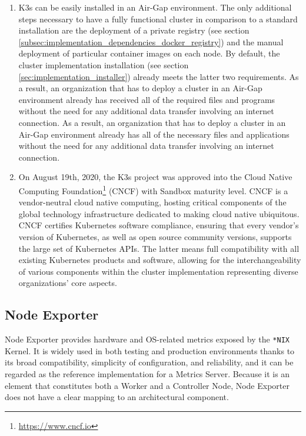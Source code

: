 \begin{enumerate}
  \item K3s can be easily installed in an Air-Gap environment. The only
    additional steps necessary to have a fully functional cluster in comparison
    to a standard installation are the deployment of a private registry (see section
    \ref{subsec:implementation_dependencies_docker_registry}) and the manual
    deployment of particular container images on each node\cite{k3s_airgap}.
    \newline
    By default, the cluster implementation installation (see section
    \ref{sec:implementation_installer}) already meets the latter two requirements.
    As a result, an organization that has to deploy a cluster in an Air-Gap environment
    already has received all of the required files and programs without the need
    for any additional data transfer involving an internet connection. As a
    result, an organization that has to deploy a cluster in an Air-Gap environment
    already has all of the necessary files and applications without the need for
    any additional data transfer involving an internet connection.

  \item On August 19th, 2020, the K3s project was approved into the Cloud Native
    Computing Foundation\footnote{\url{https://www.cncf.io}} (CNCF) with Sandbox
    maturity level\cite{cncf_k3s}. CNCF is a vendor-neutral cloud native computing,
    hosting critical components of the global technology infrastructure
    dedicated to making cloud native ubiquitous\cite{cncf}. CNCF certifies
    Kubernetes software compliance, ensuring that every vendor's version of Kubernetes,
    as well as open source community versions, supports the large set of Kubernetes
    APIs\cite{cncf_conformance}. The latter means full compatibility with all existing
    Kubernetes products and software, allowing for the interchangeability of
    various components within the cluster implementation representing diverse
    organizations' core aspects.
\end{enumerate}

\subsection{Node Exporter}
\label{subsec:implementation_dependencies_node_exporter}

Node Exporter provides hardware and OS-related metrics exposed by the \texttt{*NIX}
Kernel\cite{node_exporter}. It is widely used in both testing and production environments
thanks to its broad compatibility, simplicity of configuration, and reliability,
and it can be regarded as the reference implementation for a Metrics Server. Because
it is an element that constitutes both a Worker and a Controller Node, Node
Exporter does not have a clear mapping to an architectural component.

